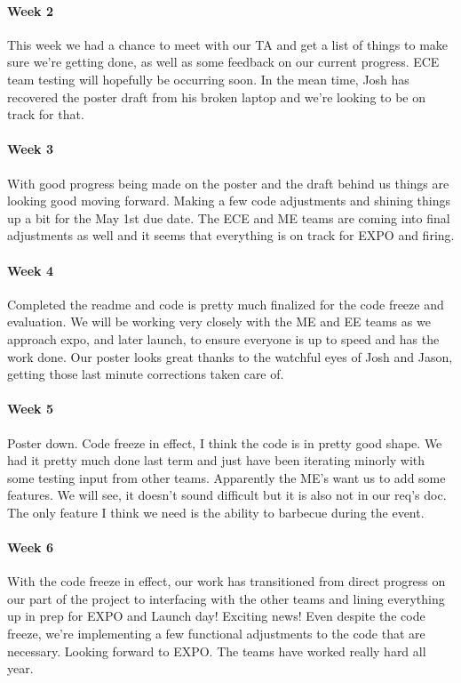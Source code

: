 \documentclass[10pt,draftclsnofoot,onecolumn,retainorgcmds]{IEEEtran}
\begin{document}
\paragraph{Week 2}
This week we had a chance to meet with our TA and get a list of things to make sure we're getting done, as well as some feedback on our current progress. ECE team testing will hopefully be occurring soon. In the mean time, Josh has recovered the poster draft from his broken laptop and we're looking to be on track for that.\\
\paragraph{Week 3}
With good progress being made on the poster and the draft behind us things are looking good moving forward. Making a few code adjustments and shining things up a bit for the May 1st due date. The ECE and ME teams are coming into final adjustments as well and it seems that everything is on track for EXPO and firing.\\
\paragraph{Week 4}
 Completed the readme and code is pretty much finalized for the code freeze and evaluation. We will be working very closely with the ME and EE teams as we approach expo, and later launch, to ensure everyone is up to speed and has the work done. Our poster looks great thanks to the watchful eyes of Josh and Jason, getting those last minute corrections taken care of.\\
\paragraph{Week 5}
Poster down. Code freeze in effect, I think the code is in pretty good shape. We had it pretty much done last term and just have been iterating minorly with some testing input from other teams. Apparently the ME's want us to add some features. We will see, it doesn't sound difficult but it is also not in our req's doc. The only feature I think we need is the ability to barbecue during the event.\\
\paragraph{Week 6}
With the code freeze in effect, our work has transitioned from direct progress on our part of the project to interfacing with the other teams and lining everything up in prep for EXPO and Launch day! Exciting news! Even despite the code freeze, we're implementing a few functional adjustments to the code that are necessary. Looking forward to EXPO. The teams have worked really hard all year. \\
\end{document}
